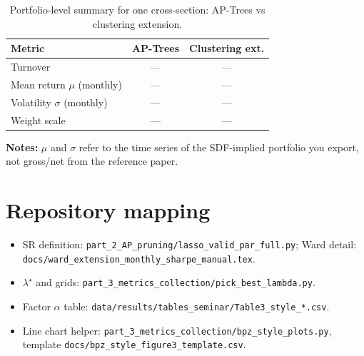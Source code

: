 \documentclass[11pt,a4paper]{article}
\begin{document}
\begin{table}[H]
  \centering
  \caption{Portfolio-level summary for one cross-section: AP-Trees vs clustering extension.}
  \label{tab:portcompare}
  \begin{tabular}{@{}l cc@{}}
    \toprule
    Metric & AP-Trees & Clustering ext. \\
    \midrule
    Turnover & --- & --- \\
    Mean return $\mu$ (monthly) & --- & --- \\
    Volatility $\sigma$ (monthly) & --- & --- \\
    Weight scale & --- & --- \\
    \bottomrule
  \end{tabular}

  \medskip
  \parbox{\linewidth}{\footnotesize\textbf{Notes:} $\mu$ and $\sigma$ refer to the time series of the SDF-implied portfolio you export, not gross/net from the reference paper.}
\end{table}

\section*{Repository mapping}

\begin{itemize}
  \item SR definition: \texttt{part\_2\_AP\_pruning/lasso\_valid\_par\_full.py}; Ward detail: \texttt{docs/ward\_extension\_monthly\_sharpe\_manual.tex}.
  \item $\lambda^\star$ and grids: \texttt{part\_3\_metrics\_collection/pick\_best\_lambda.py}.
  \item Factor $\alpha$ table: \texttt{data/results/tables\_seminar/Table3\_style\_*.csv}.
  \item Line chart helper: \texttt{part\_3\_metrics\_collection/bpz\_style\_plots.py}, template \texttt{docs/bpz\_style\_figure3\_template.csv}.
\end{itemize}
\end{document}
